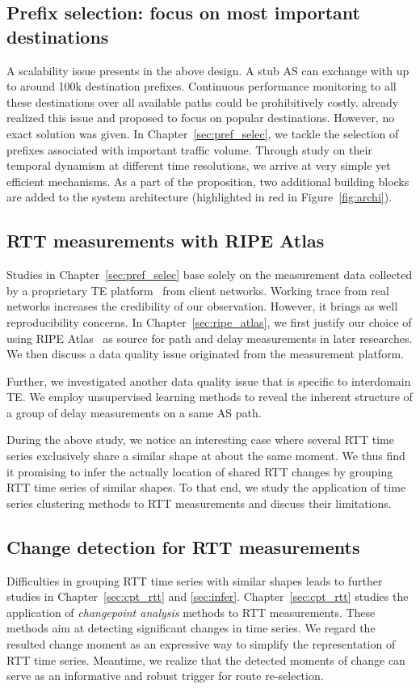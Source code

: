 \subsection{Prefix selection: focus on most important destinations}
A scalability issue presents in the above design.
A stub AS can exchange with up to around 100k destination prefixes.
Continuous performance monitoring to all these destinations over all available paths could be prohibitively costly.
\citet{Feamster2003} already realized this issue and proposed to focus on popular destinations.
However, no exact solution was given.
In Chapter~\ref{sec:pref_selec}, we tackle the selection of prefixes associated with important traffic volume.
Through study on their temporal dynamism at different time resolutions, we arrive at very simple yet efficient mechanisms. 
As a part of the proposition, two additional building blocks are added to the system architecture (highlighted in red in Figure~\ref{fig:archi}).

\subsection{RTT measurements with RIPE Atlas}
Studies in Chapter~\ref{sec:pref_selec} base solely on the measurement data collected by a proprietary TE platform~\cite{b6} from client networks. 
Working trace from real networks increases the credibility of our observation. 
However, it brings as well reproducibility concerns.
In Chapter~\ref{sec:ripe_atlas}, we first justify our choice of using RIPE Atlas~\cite{atlas} as source for path and delay measurements in later researches.
We then discuss a data quality issue originated from the measurement platform.

Further, we investigated another data quality issue that is specific to interdomain TE. 
We employ unsupervised learning methods to reveal the inherent structure of a group of delay measurements on a same AS path.

During the above study, we notice an interesting case where several RTT time series exclusively share a similar shape at about the same moment.
We thus find it promising to infer the actually location of shared RTT changes by grouping RTT time series of similar shapes. 
To that end, we study the application of time series clustering methods to RTT measurements and discuss their limitations.

\subsection{Change detection for RTT measurements}
Difficulties in grouping RTT time series with similar shapes leads to further studies in Chapter~\ref{sec:cpt_rtt} and \ref{sec:infer}. 
Chapter~\ref{sec:cpt_rtt} studies the application of \textit{changepoint analysis} methods to RTT measurements. 
These methods aim at detecting significant changes in time series.
We regard the resulted change moment as an expressive way to simplify the representation of RTT time series. 
Meantime, we realize that the detected moments of change can serve as an informative and robust trigger for route re-selection.

